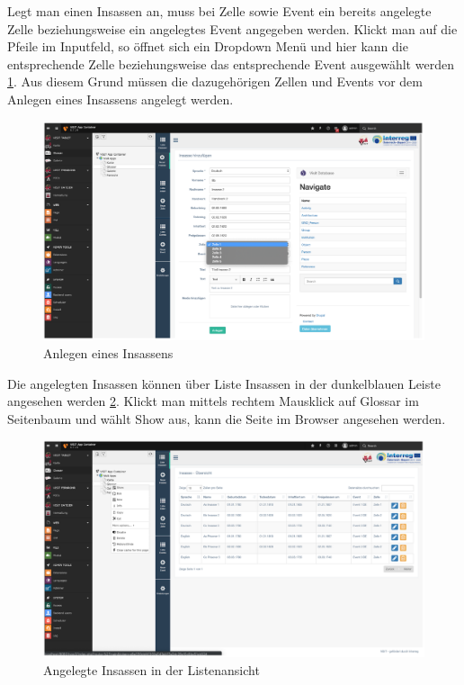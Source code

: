 Legt man einen Insassen an, muss bei Zelle sowie Event ein bereits angelegte Zelle beziehungsweise ein angelegtes Event angegeben werden. Klickt man auf die Pfeile im Inputfeld, so öffnet sich ein Dropdown Menü und hier kann die entsprechende Zelle beziehungsweise das entsprechende Event ausgewählt werden \ref{img:anlegen_insassen_auswahl}. Aus diesem Grund müssen die dazugehörigen Zellen und Events vor dem Anlegen eines Insassens angelegt werden.
\begin{figure}[ht!]
\centering
\includegraphics[width=12cm]{Figures/paula/glossar/anlegen_insassen_auswahl.png}
\caption{Anlegen eines Insassens}
\label{img:anlegen_insassen_auswahl}
\end{figure}
Die angelegten Insassen können über \glqq Liste Insassen\grqq{} in der dunkelblauen Leiste angesehen werden \ref{img:angelegte_insassen_listenuebersicht}. Klickt man mittels rechtem Mausklick auf \glqq Glossar\grqq{} im Seitenbaum und wählt \glqq Show\grqq{} aus, kann die Seite im Browser angesehen werden.
\begin{figure}[ht!]
\centering
\includegraphics[width=12cm]{Figures/paula/glossar/angelegte_insassen_listenuebersicht.png}
\caption{Angelegte Insassen in der Listenansicht}
\label{img:angelegte_insassen_listenuebersicht}
\end{figure}
